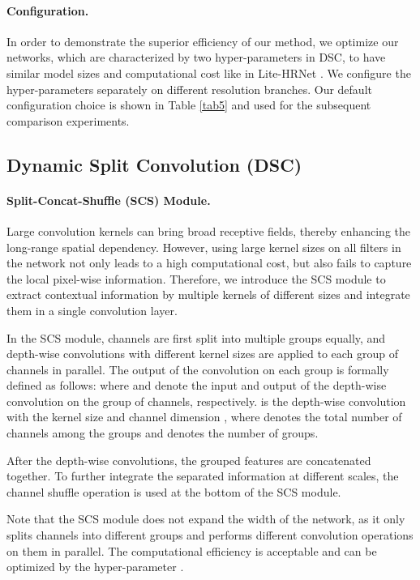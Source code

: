 \documentclass{article}
\begin{document}
\paragraph{Configuration.} In order to demonstrate the superior efficiency of our method, we optimize our networks, which are characterized by two hyper-parameters in DSC, to have similar model sizes and computational cost like in Lite-HRNet \cite{yu:litehrnet}. We configure the hyper-parameters separately on different resolution branches. Our default configuration choice is shown in Table \ref{tab5} and used for the subsequent comparison experiments. 

\subsection{Dynamic Split Convolution (DSC)}

\paragraph{Split-Concat-Shuffle (SCS) Module.} Large convolution kernels can bring broad receptive fields, thereby enhancing the long-range spatial dependency. However, using large kernel sizes on all filters in the network not only leads to a high computational cost, but also fails to capture the local pixel-wise information. Therefore, we introduce the SCS module to extract contextual information by multiple kernels of different sizes and integrate them in a single convolution layer.

In the SCS module, channels are first split into multiple groups equally, and depth-wise convolutions with different kernel sizes are applied to each group of channels in parallel. The output of the convolution on each group is formally defined as follows:
where  and  denote the input and output of the depth-wise convolution on the  group of channels, respectively.  is the depth-wise convolution with the kernel size  and channel dimension , where  denotes the total number of channels among the groups and  denotes the number of groups. 

After the depth-wise convolutions, the grouped features are concatenated together. To further integrate the separated information at different scales, the channel shuffle operation \cite{ma:shuffle2} is used at the bottom of the SCS module. 

Note that the SCS module does not expand the width of the network, as it only splits channels into different groups and performs different convolution operations on them in parallel. The computational efficiency is acceptable and can be optimized by the hyper-parameter .
\end{document}
